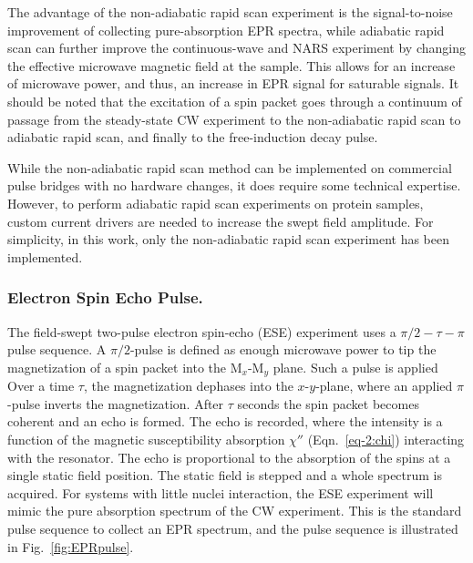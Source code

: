 The advantage of the non-adiabatic rapid scan experiment is the signal-to-noise improvement of collecting pure-absorption EPR spectra, while adiabatic rapid scan can further improve the continuous-wave and NARS experiment by changing the effective microwave magnetic field at the sample. This allows for an increase of microwave power, and thus, an increase in EPR signal for saturable signals. \cite{JOSHI200544} It should be noted that the excitation of a spin packet goes through a continuum of passage from the steady-state CW experiment to the non-adiabatic rapid scan to adiabatic rapid scan, and finally to the free-induction decay pulse. 

While the non-adiabatic rapid scan method can be implemented on commercial pulse bridges with no hardware changes, it does require some technical expertise. \cite{MOSER2017} However, to perform adiabatic rapid scan experiments on protein samples, custom current drivers are needed to increase the swept field amplitude. For simplicity, in this work, only the non-adiabatic rapid scan experiment has been implemented.

\subsubsection*{Electron Spin Echo Pulse.}
The field-swept two-pulse electron spin-echo (ESE) experiment uses a ${\pi/2\!-\!\tau\!-\!\pi}$ pulse sequence. A $\pi/2$-pulse is defined as enough microwave power to tip the magnetization of a spin packet into the M$_x$-M$_y$ plane. Such a pulse is applied Over a time $\tau$, the magnetization dephases into the $x$-$y$-plane, where an applied $\pi$-pulse inverts the magnetization. After $\tau$ seconds the spin packet becomes coherent and an echo is formed. The echo is recorded, where the intensity is a function of the magnetic susceptibility absorption $\chi''$ (Eqn.~\ref{eq-2:chi}) interacting with the resonator. The echo is proportional to the absorption of the spins at a single static field position. The static field is stepped and a whole spectrum is acquired. \cite{schweiger2001principles} For systems with little nuclei interaction, the ESE experiment will mimic the pure absorption spectrum of the CW experiment. This is the standard pulse sequence to collect an EPR spectrum, and the pulse sequence is illustrated in Fig.~\ref{fig:EPRpulse}.

